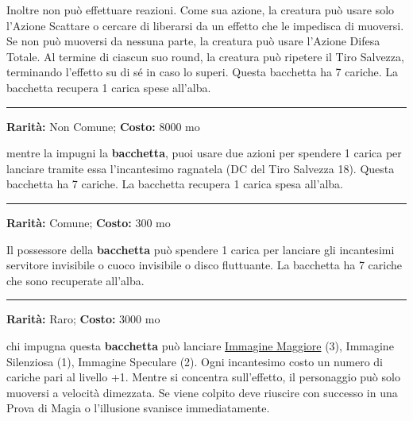 \begin{multicols}{2}
Inoltre non può effettuare reazioni. Come sua azione, la creatura può usare solo l'Azione Scattare o cercare di liberarsi da un effetto che le impedisca di muoversi. Se non può muoversi da nessuna parte, la creatura può usare l'Azione Difesa Totale. Al termine di ciascun suo round, la creatura può ripetere il Tiro Salvezza, terminando l'effetto su di sé in caso lo superi. Questa bacchetta ha 7 cariche. La bacchetta recupera 1 carica spese all'alba.

\smallskip\noindent\rule{\linewidth}{2pt}  \hypertarget{BacchettadellaRagnatela}{}\medskip{}\noindent\label{BacchettadellaRagnatela}

\textbf{Rarità:} Non Comune; \textbf{Costo:} 8000 mo

mentre la impugni la \textbf{bacchetta}, puoi usare due azioni per spendere 1 carica per lanciare tramite essa l'incantesimo ragnatela (DC del Tiro Salvezza 18). Questa bacchetta ha 7 cariche. La bacchetta recupera 1 carica spesa all'alba.

\smallskip\noindent\rule{\linewidth}{2pt}  \hypertarget{BacchettadelleComodità}{}\medskip{}\noindent\label{BacchettadelleComodità}

\textbf{Rarità:} Comune; \textbf{Costo:} 300 mo

Il possessore della \textbf{bacchetta} può spendere 1 carica per lanciare gli incantesimi servitore invisibile o cuoco invisibile o disco fluttuante. La bacchetta ha 7 cariche che sono recuperate all'alba.

\smallskip\noindent\rule{\linewidth}{2pt}  \hypertarget{BacchettadelleIllusioni}{}\medskip{}\noindent\label{BacchettadelleIllusioni}

\textbf{Rarità:} Raro; \textbf{Costo:} 3000 mo

chi impugna questa \textbf{bacchetta} può lanciare \hyperlink{Immagine Maggiore}{Immagine Maggiore} (3), Immagine Silenziosa (1), Immagine Speculare (2). Ogni incantesimo costo un numero di cariche pari al livello +1. Mentre si concentra sull'effetto, il personaggio può solo muoversi a velocità dimezzata. Se viene colpito deve riuscire con successo in una Prova di Magia o l'illusione svanisce immediatamente.


\end{multicols}
